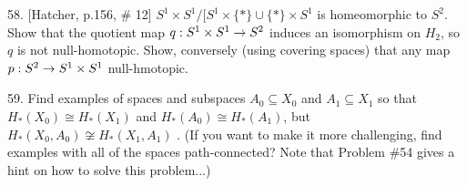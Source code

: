 \documentclass[12pt]{article}
\begin{document}
\begin{description}
\msk

\item{58.} [Hatcher, p.156, \# 12] 
$S^1\times S^1/[S^1\times\{*\}\cup\{*\}\times S^1$ is homeomorphic to $S^2$.
Show that the quotient map $q:S^1\times S^1\rightarrow S^2$ induces an isomorphism on $H_2$,
so $q$ is not null-homotopic. Show, conversely (using covering spaces) that 
any map $p:S^2\rightarrow S^1\times S^1$  null-hmotopic.

\msk

\item{59.} Find examples of spaces and subspaces
$A_0\subseteq X_0$ and $A_1\subseteq X_1$ so that
$H_*(X_0)\cong H_*(X_1)$ and $H_*(A_0)\cong H_*(A_1)$,
but $H_*(X_0,A_0)\not\cong H_*(X_1,A_1)$ . (If you want to make
it more challenging, find examples with all of the spaces path-connected?
Note that Problem \#54 gives a hint on how  to solve this problem...)




\end{description}
\vfill
\end{document}
